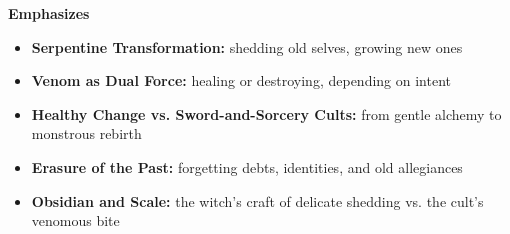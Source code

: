 \noindent\textbf{Emphasizes}
\begin{itemize}
  \item \textbf{Serpentine Transformation:} shedding old selves, growing new ones
  \item \textbf{Venom as Dual Force:} healing or destroying, depending on intent
  \item \textbf{Healthy Change vs. Sword-and-Sorcery Cults:} from gentle alchemy to monstrous rebirth
  \item \textbf{Erasure of the Past:} forgetting debts, identities, and old allegiances
  \item \textbf{Obsidian and Scale:} the witch's craft of delicate shedding vs. the cult's venomous bite
\end{itemize}

